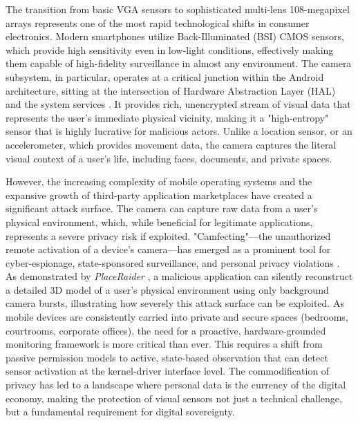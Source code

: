\documentclass[12pt,a4paper]{report}
\begin{document}
    The transition from basic VGA sensors to sophisticated multi-lens 108-megapixel arrays represents one of the most rapid technological shifts in consumer electronics. Modern smartphones utilize Back-Illuminated (BSI) CMOS sensors, which provide high sensitivity even in low-light conditions, effectively making them capable of high-fidelity surveillance in almost any environment. The camera subsystem, in particular, operates at a critical junction within the Android architecture, sitting at the intersection of Hardware Abstraction Layer (HAL) and the system services \cite{androidhal}. It provides rich, unencrypted stream of visual data that represents the user's immediate physical vicinity, making it a "high-entropy" sensor that is highly lucrative for malicious actors. Unlike a location sensor, or an accelerometer, which provides movement data, the camera captures the literal visual context of a user's life, including faces, documents, and private spaces.

    However, the increasing complexity of mobile operating systems and the expansive growth of third-party application marketplaces have created a significant attack surface. The camera can capture raw data from a user's physical environment, which, while beneficial for legitimate applications, represents a severe privacy risk if exploited. "Camfecting"—the unauthorized remote activation of a device's camera—has emerged as a prominent tool for cyber-espionage, state-sponsored surveillance, and personal privacy violations \cite{checkmarx}. As demonstrated by \textit{PlaceRaider} \cite{placeraider}, a malicious application can silently reconstruct a detailed 3D model of a user's physical environment using only background camera bursts, illustrating how severely this attack surface can be exploited. As mobile devices are consistently carried into private and secure spaces (bedrooms, courtrooms, corporate offices), the need for a proactive, hardware-grounded monitoring framework is more critical than ever. This requires a shift from passive permission models to active, state-based observation that can detect sensor activation at the kernel-driver interface level. The commodification of privacy has led to a landscape where personal data is the currency of the digital economy, making the protection of visual sensors not just a technical challenge, but a fundamental requirement for digital sovereignty.
\end{document}
